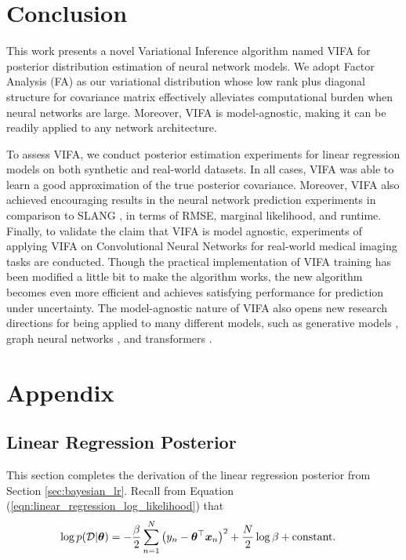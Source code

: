 \documentclass[10pt]{article} %
\begin{document}
\section{Conclusion}
\label{Conclusion}
 This work presents a novel Variational Inference algorithm named VIFA for posterior distribution estimation of neural network models. We adopt Factor Analysis (FA) as our variational distribution whose low rank plus diagonal structure for covariance matrix effectively alleviates computational burden when neural networks are large. Moreover, VIFA is model-agnostic, making it can be readily applied to any network architecture. 
 
To assess VIFA, we conduct posterior estimation experiments for linear regression models on both synthetic and real-world datasets. In all cases,
VIFA was able to learn a good approximation of the true posterior covariance. Moreover, VIFA also achieved encouraging results in the neural network prediction experiments in comparison to SLANG \citep{mishkin2018}, in terms of RMSE, marginal likelihood, and runtime. Finally, to validate the claim that VIFA is model agnostic, experiments of applying VIFA on Convolutional Neural Networks for real-world medical imaging tasks are conducted. Though the practical implementation of VIFA training has been modified a little bit to make the algorithm works, the new algorithm becomes even more efficient and achieves satisfying performance for prediction under uncertainty. The model-agnostic nature of VIFA also opens new research directions for being applied to many different models, such as generative models \citep{harshvardhan2020comprehensive}, graph neural networks \citep{wu2020comprehensive}, and transformers \citep{vaswani2017attention}. 
 





\appendix

\section{Appendix}

\subsection{Linear Regression Posterior}
\label{app:bayesian_linear_regression_posterior}
 
This section completes the derivation of the linear regression posterior from Section \ref{sec:bayesian_lr}. Recall from Equation (\ref{eqn:linear_regression_log_likelihood}) that
\begin{align}
\begin{split}
    \log p(\mathcal{D} | {\bm{\theta}}) & = - \frac{\beta}{2} \sum_{n=1}^N \big(y_n - {\bm{\theta}}^\top {\bm{x}}_n \big)^2 + \frac{N}{2} \log \beta + \text{constant}.
\end{split}
\end{align}
\end{document}
